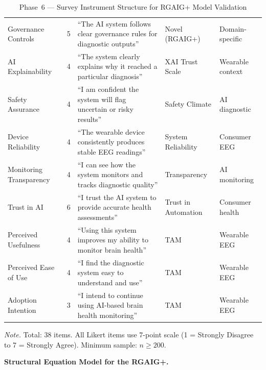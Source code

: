\begin{xltabular}{\textwidth}{@{} l c X X l @{}}
\caption{Phase~6 --- Survey Instrument Structure for RGAIG+ Model Validation}
\label{tab:rgaig_survey_instrument}\\
\toprule
{} &  &  &  &  \\
\midrule
\endfirsthead
\endhead
\bottomrule
\endlastfoot
Governance Controls & 5 & ``The AI system follows clear governance rules for diagnostic outputs'' & Novel (RGAIG+) & Domain-specific \\
\addlinespace
AI Explainability & 4 & ``The system clearly explains why it reached a particular diagnosis'' & XAI Trust Scale & Wearable context \\
\addlinespace
Safety Assurance & 4 & ``I am confident the system will flag uncertain or risky results'' & Safety Climate & AI diagnostic \\
\addlinespace
Device Reliability & 4 & ``The wearable device consistently produces stable EEG readings'' & System Reliability & Consumer EEG \\
\addlinespace
Monitoring Transparency & 4 & ``I can see how the system monitors and tracks diagnostic quality'' & Transparency & AI monitoring \\
\addlinespace
Trust in AI & 6 & ``I trust the AI system to provide accurate health assessments'' & Trust in Automation & Consumer health \\
\addlinespace
Perceived Usefulness & 4 & ``Using this system improves my ability to monitor brain health'' & TAM \citep{davis1989tam} & Wearable EEG \\
\addlinespace
Perceived Ease of Use & 4 & ``I find the diagnostic system easy to understand and use'' & TAM \citep{davis1989tam} & Wearable EEG \\
\addlinespace
Adoption Intention & 3 & ``I intend to continue using AI-based brain health monitoring'' & TAM \citep{davis1989tam} & Wearable EEG \\
\end{xltabular}
\par\smallskip\noindent\textit{Note.} Total: 38 items. All Likert items use 7-point scale (1 = Strongly Disagree to 7 = Strongly Agree). Minimum sample: $n \geq 200$.
\endgroup

\vspace{1.5em}

\noindent\textbf{Structural Equation Model for the RGAIG+.}

